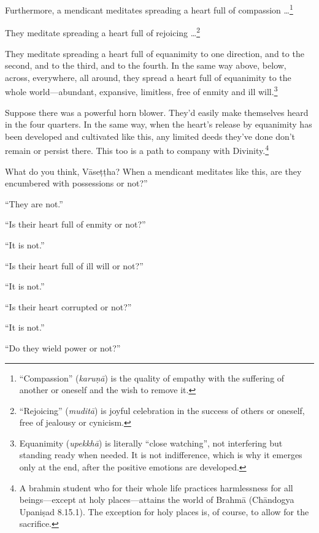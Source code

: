 \documentclass[12pt,openany]{book}%
\begin{document}
Furthermore, a mendicant meditates spreading a heart full of compassion …\footnote{“Compassion” (\textit{\textsanskrit{karuṇā}}) is the quality of empathy with the suffering of another or oneself and the wish to remove it. } 

They meditate spreading a heart full of rejoicing …\footnote{“Rejoicing” (\textit{\textsanskrit{muditā}}) is joyful celebration in the success of others or oneself, free of jealousy or cynicism. } 

They meditate spreading a heart full of equanimity to one direction, and to the second, and to the third, and to the fourth. In the same way above, below, across, everywhere, all around, they spread a heart full of equanimity to the whole world—abundant, expansive, limitless, free of enmity and ill will.\footnote{Equanimity (\textit{\textsanskrit{upekkhā}}) is literally “close watching”, not interfering but standing ready when needed. It is not indifference, which is why it emerges only at the end, after the positive emotions are developed. } 

Suppose there was a powerful horn blower. They’d easily make themselves heard in the four quarters. In the same way, when the heart’s release by equanimity has been developed and cultivated like this, any limited deeds they’ve done don’t remain or persist there. This too is a path to company with Divinity.\footnote{A brahmin student who for their whole life practices harmlessness for all beings—except at holy places—attains the world of \textsanskrit{Brahmā} (\textsanskrit{Chāndogya} \textsanskrit{Upaniṣad} 8.15.1). The exception for holy places is, of course, to allow for the sacrifice. } 

What do you think, \textsanskrit{Vāseṭṭha}? When a mendicant meditates like this, are they encumbered with possessions or not?” 

“They are not.” 

“Is their heart full of enmity or not?” 

“It is not.” 

“Is their heart full of ill will or not?” 

“It is not.” 

“Is their heart corrupted or not?” 

“It is not.” 

“Do they wield power or not?” 
\end{document}
